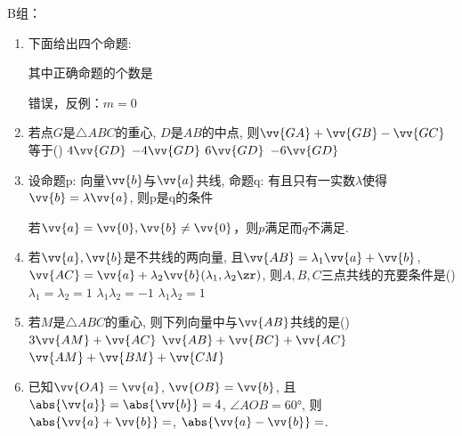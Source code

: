 B组：
\begin{enumerate}
    \item 下面给出四个命题: 
    其中正确命题的个数是
    \begin{jieda}
        错误，反例：$m = 0$
    \end{jieda}

    
    \item 若点$G$是$\triangle{ABC}$的重心, $D$是$AB$的中点, 则$\vv{GA}+\vv{GB}-\vv{GC}$等于\dotfill()
    \xx
    {$4\vv{GD}$}
    {$-4\vv{GD}$}
    {$6\vv{GD}$}
    {$-6\vv{GD}$}
    \item 设命题p: 向量$\vv{b}$与$\vv{a}$共线, 命题q: 有且只有一实数$\lambda$使得$\vv{b}=\lambda\vv{a}$, 则p是q的条件
    \begin{jieda}
        若$\vv{a} = \vv{0}, \vv{b} \neq \vv{0}$，则$p$满足而$q$不满足.
    \end{jieda}

    
    \item 若$\vv{a},\vv{b}$是不共线的两向量, 且$\vv{AB}=\lambda_1\vv{a}+\vv{b}$, $\vv{AC}=\vv{a}+\lambda_2\vv{b}(\lambda_1,\lambda_2\zr)$, 则$A,B,C$三点共线的充要条件是\dotfill()
    {$\lambda_1=\lambda_2=1$}
    {$\lambda_1\lambda_2=-1$}
    {$\lambda_1\lambda_2=1$}

    
    \item 若$M$是$\triangle{ABC}$的重心, 则下列向量中与$\vv{AB}$共线的是\dotfill()
    {$3\vv{AM}+\vv{AC}$}
    {$\vv{AB}+\vv{BC}+\vv{AC}$}
    {$\vv{AM}+\vv{BM}+\vv{CM}$}

    
    \item 已知$\vv{OA}=\vv{a}$, $\vv{OB}=\vv{b}$, 且$\abs{\vv{a}}=\abs{\vv{b}}=4$, $\angle{AOB}=\ang{60}$, 
    则$\abs{\vv{a}+\vv{b}}=$, $\abs{\vv{a}-\vv{b}}=$. 


\end{enumerate}
